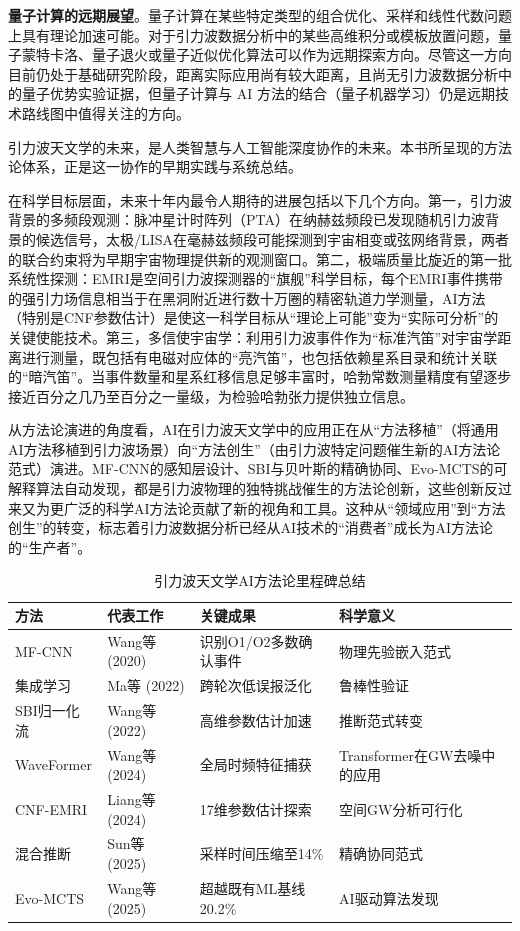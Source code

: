 \textbf{量子计算的远期展望}。量子计算在某些特定类型的组合优化、采样和线性代数问题上具有理论加速可能。对于引力波数据分析中的某些高维积分或模板放置问题，量子蒙特卡洛、量子退火或量子近似优化算法可以作为远期探索方向。尽管这一方向目前仍处于基础研究阶段，距离实际应用尚有较大距离，且尚无引力波数据分析中的量子优势实验证据，但量子计算与 AI 方法的结合（量子机器学习）仍是远期技术路线图中值得关注的方向。

引力波天文学的未来，是人类智慧与人工智能深度协作的未来。本书所呈现的方法论体系，正是这一协作的早期实践与系统总结。

在科学目标层面，未来十年内最令人期待的进展包括以下几个方向。第一，引力波背景的多频段观测：脉冲星计时阵列（PTA）在纳赫兹频段已发现随机引力波背景的候选信号，太极/LISA在毫赫兹频段可能探测到宇宙相变或弦网络背景，两者的联合约束将为早期宇宙物理提供新的观测窗口。第二，极端质量比旋近的第一批系统性探测：EMRI是空间引力波探测器的“旗舰”科学目标，每个EMRI事件携带的强引力场信息相当于在黑洞附近进行数十万圈的精密轨道力学测量，AI方法（特别是CNF参数估计）是使这一科学目标从“理论上可能”变为“实际可分析”的关键使能技术。第三，多信使宇宙学：利用引力波事件作为“标准汽笛”对宇宙学距离进行测量，既包括有电磁对应体的“亮汽笛”，也包括依赖星系目录和统计关联的“暗汽笛”。当事件数量和星系红移信息足够丰富时，哈勃常数测量精度有望逐步接近百分之几乃至百分之一量级，为检验哈勃张力提供独立信息。

从方法论演进的角度看，AI在引力波天文学中的应用正在从“方法移植”（将通用AI方法移植到引力波场景）向“方法创生”（由引力波特定问题催生新的AI方法论范式）演进。MF-CNN的感知层设计、SBI与贝叶斯的精确协同、Evo-MCTS的可解释算法自动发现，都是引力波物理的独特挑战催生的方法论创新，这些创新反过来又为更广泛的科学AI方法论贡献了新的视角和工具。这种从“领域应用”到“方法创生”的转变，标志着引力波数据分析已经从AI技术的“消费者”成长为AI方法论的“生产者”。

\begin{table}[htbp]
\centering
\caption{引力波天文学AI方法论里程碑总结}
\label{tab:ai_milestones}
\small
\begin{tabular}{llll}
\hline
\textbf{方法} & \textbf{代表工作} & \textbf{关键成果} & \textbf{科学意义} \\
\hline
MF-CNN & Wang等 (2020) & 识别O1/O2多数确认事件 & 物理先验嵌入范式 \\
集成学习 & Ma等 (2022) & 跨轮次低误报泛化 & 鲁棒性验证 \\
SBI归一化流 & Wang等 (2022) & 高维参数估计加速 & 推断范式转变 \\
WaveFormer & Wang等 (2024) & 全局时频特征捕获 & Transformer在GW去噪中的应用 \\
CNF-EMRI & Liang等 (2024) & 17维参数估计探索 & 空间GW分析可行化 \\
混合推断 & Sun等 (2025) & 采样时间压缩至14\% & 精确协同范式 \\
Evo-MCTS & Wang等 (2025) & 超越既有ML基线20.2\% & AI驱动算法发现 \\
\hline
\end{tabular}
\end{table}

